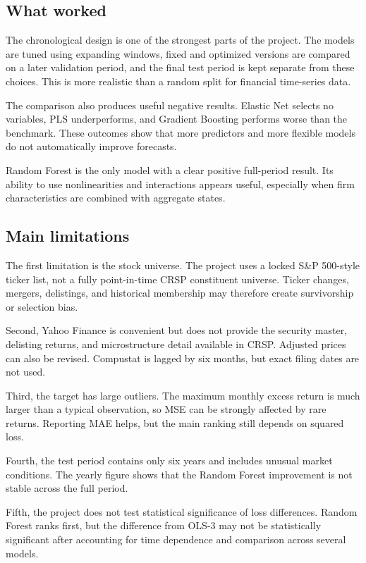 \documentclass[11pt,a4paper]{article}
\begin{document}
\subsection{What worked}

The chronological design is one of the strongest parts of the project. The
models are tuned using expanding windows, fixed and optimized versions are
compared on a later validation period, and the final test period is kept
separate from these choices. This is more realistic than a random split for
financial time-series data.

The comparison also produces useful negative results. Elastic Net selects no
variables, PLS underperforms, and Gradient Boosting performs worse than the
benchmark. These outcomes show that more predictors and more flexible models do
not automatically improve forecasts.

Random Forest is the only model with a clear positive full-period result. Its
ability to use nonlinearities and interactions appears useful, especially when
firm characteristics are combined with aggregate states.

\subsection{Main limitations}

The first limitation is the stock universe. The project uses a locked S\&P
500-style ticker list, not a fully point-in-time CRSP constituent universe.
Ticker changes, mergers, delistings, and historical membership may therefore
create survivorship or selection bias.

Second, Yahoo Finance is convenient but does not provide the security master,
delisting returns, and microstructure detail available in CRSP. Adjusted prices
can also be revised. Compustat is lagged by six months, but exact filing dates
are not used.

Third, the target has large outliers. The maximum monthly excess return is much
larger than a typical observation, so MSE can be strongly affected by rare
returns. Reporting MAE helps, but the main ranking still depends on squared
loss.

Fourth, the test period contains only six years and includes unusual market
conditions. The yearly figure shows that the Random Forest improvement is not
stable across the full period.

Fifth, the project does not test statistical significance of loss differences.
Random Forest ranks first, but the difference from OLS-3 may not be statistically
significant after accounting for time dependence and comparison across several
models.
\end{document}
